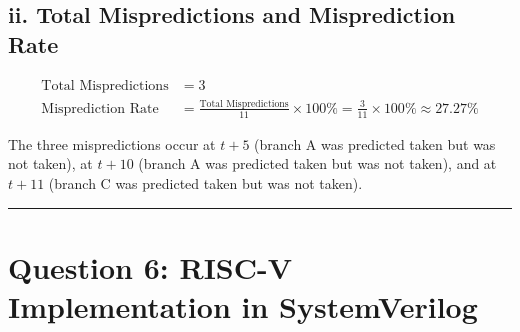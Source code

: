 \documentclass[11pt, a4paper]{article}
\begin{document}
\subsection*{ii. Total Mispredictions and Misprediction Rate}
\begin{align*}
    \text{Total Mispredictions} &= 3 \\
    \text{Misprediction Rate} &= \frac{\text{Total Mispredictions}}{11} \times 100\% = \frac{3}{11} \times 100\% \approx \mathbf{27.27\%}
\end{align*}

The three mispredictions occur at $t+5$ (branch A was predicted taken but was not taken), at $t+10$ (branch A was predicted taken but was not taken), and at $t+11$ (branch C was predicted taken but was not taken).

\vspace{8pt}
\hrule
\vspace{8pt}

\section*{\textcolor{accent}{Question 6: RISC-V Implementation in SystemVerilog}}
\end{document}
